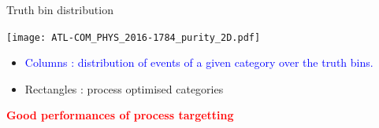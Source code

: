 \begin{frame}{Truth bin distribution}
  \begin{minipage}{0.6\linewidth}
      \texttt{[image: ATL-COM\_PHYS\_2016-1784\_purity\_2D.pdf]}
  \end{minipage}
  \hfill
  \begin{minipage}{0.39\linewidth}
    \begin{itemize}
    \item \textcolor{blue}{Columns : distribution of events of a given category over the truth bins.}
    \item Rectangles : process optimised categories
    \end{itemize}
  \end{minipage}
  
  \centering
  \textcolor{red}{\bf Good performances of process targetting}
\end{frame}
